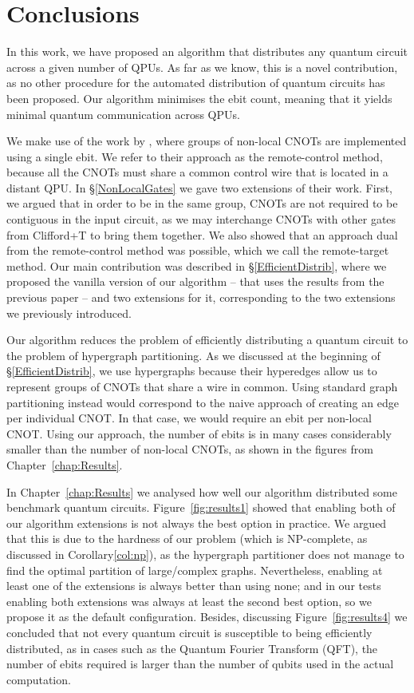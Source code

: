 \chapter{Conclusions}
\label{chap:Conclusions}

In this work, we have proposed an algorithm that distributes any quantum circuit across a given number of QPUs. As far as we know, this is a novel contribution, as no other procedure for the automated distribution of quantum circuits has been proposed. Our algorithm minimises the ebit count, meaning that it yields minimal quantum communication across QPUs.

We make use of the work by \citet{NonLocalCNOT}, where groups of non-local CNOTs are implemented using a single ebit. We refer to their approach as the remote-control method, because all the CNOTs must share a common control wire that is located in a distant QPU. In \S\ref{NonLocalGates} we gave two extensions of their work. First, we argued that in order to be in the same group, CNOTs are not required to be contiguous in the input circuit, as we may interchange CNOTs with other gates from Clifford+T to bring them together. We also showed that an approach dual from the remote-control method was possible, which we call the remote-target method. Our main contribution was described in \S\ref{EfficientDistrib}, where we proposed the vanilla version of our algorithm -- that uses the results from the previous paper -- and two extensions for it, corresponding to the two extensions we previously introduced. 

Our algorithm reduces the problem of efficiently distributing a quantum circuit to the problem of hypergraph partitioning. As we discussed at the beginning of \S\ref{EfficientDistrib}, we use hypergraphs because their hyperedges allow us to represent groups of CNOTs that share a wire in common. Using standard graph partitioning instead would correspond to the naive approach of creating an edge per individual CNOT. In that case, we would require an ebit per non-local CNOT. Using our approach, the number of ebits is in many cases considerably smaller than the number of non-local CNOTs, as shown in the figures from Chapter~\ref{chap:Results}.

In Chapter~\ref{chap:Results} we analysed how well our algorithm distributed some benchmark quantum circuits. Figure~\ref{fig:results1} showed that enabling both of our algorithm extensions is not always the best option in practice. We argued that this is due to the hardness of our problem (which is NP-complete, as discussed in Corollary\ref{col:np}), as the hypergraph partitioner does not manage to find the optimal partition of large/complex graphs. Nevertheless, enabling at least one of the extensions is always better than using none; and in our tests enabling both extensions was always at least the second best option, so we propose it as the default configuration. Besides, discussing Figure~\ref{fig:results4} we concluded that not every quantum circuit is susceptible to being efficiently distributed, as in cases such as the Quantum Fourier Transform (QFT), the number of ebits required is larger than the number of qubits used in the actual computation. 

